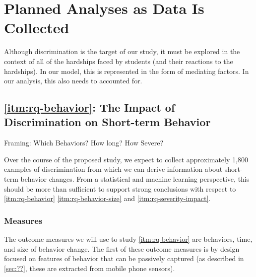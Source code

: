 
\section{Planned Analyses as Data Is Collected}

Although discrimination is the target of our study, it must be explored in the context of all of the hardships faced by students (and their reactions to the hardships). In our model, this is represented in the form of mediating factors. In our analysis, this also needs to accounted for.

\subsection{\ref{itm:rq-behavior}: The Impact of Discrimination on Short-term Behavior}

 Framing: Which Behaviors? How long? How Severe?
 
 Over the course of the proposed study, we expect to collect approximately 1,800 examples of discrimination from which we can derive information about short- term behavior changes. From a statistical and machine learning perspective, this should be more than sufficient to support strong conclusions with respect to \ref{itm:rq-behavior} \ref{itm:rq-behavior-size} and \ref{itm:rq-severity-impact}.

\subsubsection{Measures} The outcome measures we will use to study \ref{itm:rq-behavior} are behaviors, time, and size of behavior change. The first of these outcome measures is by design focused on features of behavior that can be passively captured (as described in \ref{sec:??}, these are extracted from mobile phone sensors). 

